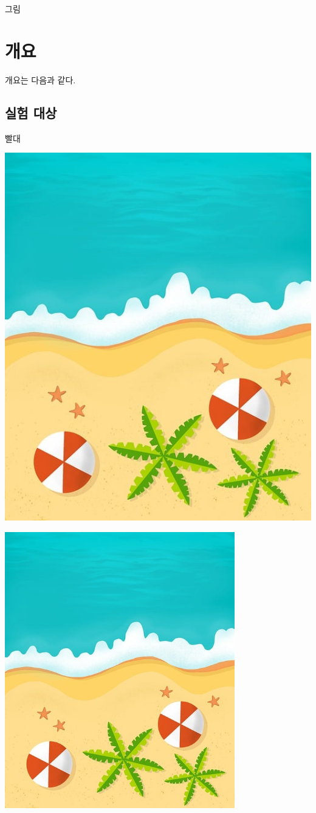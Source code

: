 \documentclass{article}
\begin{document}
{\Huge 그림}

\section{개요}
개요는 다음과 같다.

\subsection{실험 대상}
빨대

\includegraphics{image.jpg} %

\includegraphics[width=10cm]{image.jpg} %
\end{document}
